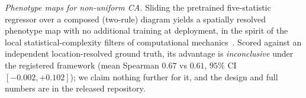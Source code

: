 \documentclass[aip,cha,amsmath,amssymb,reprint,floatfix]{revtex4-2}
\begin{document}
\emph{Phenotype maps for non-uniform CA.} Sliding the pretrained
five-statistic regressor over a composed (two-rule) diagram yields a
spatially resolved phenotype map with no additional training at deployment,
in the spirit of the local statistical-complexity filters of computational
mechanics~\cite{shalizi2006}. Scored against an independent location-resolved
ground truth, its advantage is \emph{inconclusive} under the registered
framework (mean Spearman $0.67$ vs $0.61$, $95\%$ CI $[-0.002,+0.102]$); we
claim nothing further for it, and the design and full numbers are in the
released repository.



\end{document}
